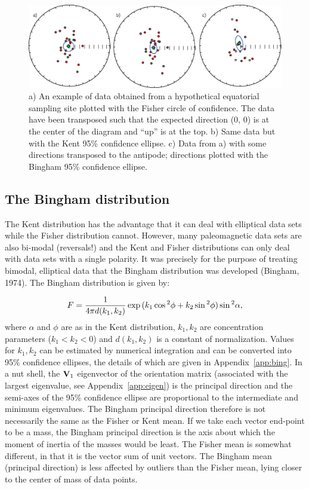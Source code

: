 \begin{figure}[htb]
\centering  \includegraphics[width= 14 cm]{EPSfiles/confidence.eps}
\caption{ a) An example  of data obtained from a hypothetical equatorial sampling site plotted with the Fisher circle of confidence.   The data have been transposed such that the expected direction (0, 0) is at the center of the diagram and ``up'' is at the top.  b) Same data but with   the Kent 95\% confidence ellipse.  c) Data from a) with some directions transposed to the antipode; directions plotted with the Bingham 95\% confidence ellipse.  }
\label{fig:confidence}
\end{figure}
    

    
 \subsection{The Bingham distribution}
 
 The Kent distribution has the advantage that it can deal with elliptical data sets while the Fisher distribution cannot.  However, many paleomagnetic data sets are also bi-modal (reversals!) and the Kent and Fisher distributions can only deal with data sets with a single polarity.    It was precisely for the purpose of treating bimodal, elliptical data that the 
 Bingham distribution was developed 
 (Bingham, 1974).    \nocite{bingham74}   The Bingham distribution is given by:
 
 $$
 F = {1\over {4\pi d(k_1,k_2)} } \exp( k_1\cos^2 \phi+k_2\sin^2\phi)\sin^2 \alpha,
 $$
 \noindent where $\alpha$ and $\phi$ are as in the Kent distribution,  $k_1,k_2$ are concentration parameters ($k_1<k_2<0$) and $d(k_1,k_2)$ is a constant of normalization. Values for $k_1,k_2$ can be estimated by numerical integration and can be converted into 95\% confidence ellipses, the details of which are  given in Appendix~\ref{app:bing}.   In a nut shell, the $\V_1$ eigenvector   of the orientation matrix (associated with the largest eigenvalue,  see Appendix~\ref{app:eigen}) is the principal direction and the semi-axes of the 95\% confidence ellipse  are proportional to the intermediate and minimum eigenvalues.  The Bingham principal direction therefore is not necessarily  the same as the Fisher or Kent  mean.  If we take each vector end-point to be a mass, the Bingham principal direction is the axis about which the moment of inertia of the masses would be least.  The Fisher mean is somewhat different, in that it is the vector sum of unit vectors.  The Bingham  mean (principal direction) is less affected by outliers than the Fisher mean, lying closer to the center of mass of data points.   
 
